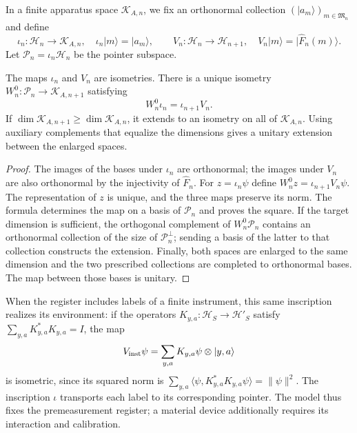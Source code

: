 In a finite apparatus space \(\mathcal K_{A,n}\), we fix an
orthonormal collection \((|a_m\rangle)_{m\in\mathfrak M_n}\) and define
\[
 \iota_n:\mathcal H_n\longrightarrow\mathcal K_{A,n},
 \quad \iota_n|m\rangle=|a_m\rangle,
 \qquad
 V_n:\mathcal H_n\longrightarrow\mathcal H_{n+1},
 \quad V_n|m\rangle=|\widehat F_n(m)\rangle.
\]
Let \(\mathcal P_n=\iota_n\mathcal H_n\) be the pointer subspace.

\begin{theorem}
\label{vii:thm:observador-entrelazador}
The maps \(\iota_n\) and \(V_n\) are isometries. There is a unique
isometry \(W_n^0:\mathcal P_n\longrightarrow\mathcal K_{A,n+1}\)
satisfying
\begin{equation}
 W_n^0\iota_n=\iota_{n+1}V_n.
 \label{vii:eq:observador-cuadrado}
\end{equation}
If \(\dim\mathcal K_{A,n+1}\geq\dim\mathcal K_{A,n}\),
it extends to an isometry on all of \(\mathcal K_{A,n}\).
Using auxiliary complements that equalize the dimensions gives
a unitary extension between the enlarged spaces.
\end{theorem}

\begin{proof}
The images of the bases under \(\iota_n\) are orthonormal; the
images under \(V_n\) are also orthonormal by the injectivity of
\(\widehat F_n\). For \(z=\iota_n\psi\) define
\(W_n^0z=\iota_{n+1}V_n\psi\). The representation of \(z\) is unique,
and the three maps preserve its norm. The formula determines the map on
a basis of \(\mathcal P_n\) and proves the square.
If the target dimension is sufficient, the orthogonal complement of
\(W_n^0\mathcal P_n\) contains an orthonormal collection of the size of
\(\mathcal P_n^\perp\); sending a basis of the latter to that collection
constructs the extension. Finally, both spaces are enlarged to
the same dimension and the two prescribed collections are completed to
orthonormal bases. The map between those bases is unitary.
\end{proof}

When the register includes labels of a finite instrument, this same
inscription realizes its environment: if the operators
\(K_{y,a}:\mathcal H_S\to\mathcal H'_S\) satisfy
\(\sum_{y,a}K_{y,a}^*K_{y,a}=I\), the map
\[
 V_{\rm inst}\psi=\sum_{y,a}K_{y,a}\psi\otimes|y,a\rangle
\]
is isometric, since its squared norm is
\(\sum_{y,a}\langle\psi,K_{y,a}^*K_{y,a}\psi\rangle=\|\psi\|^2\).
The inscription \(\iota\) transports each label to its corresponding
pointer. The model thus fixes the premeasurement register; a
material device additionally requires its interaction and calibration.

